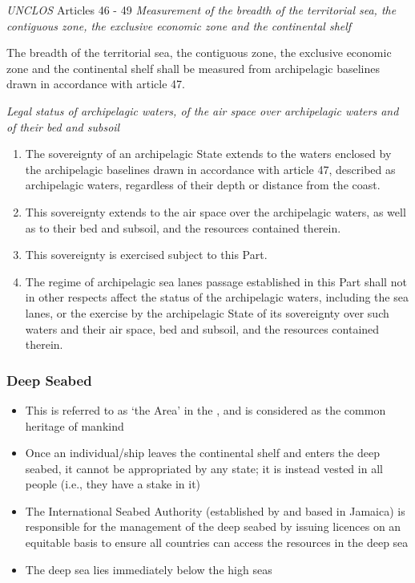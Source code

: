 \begin{conventiondetails}{\textit{UNCLOS} Articles 46 - 49}
    \textit{Measurement of the breadth of the territorial sea, the contiguous zone,
    the exclusive economic zone and the continental shelf}

    \vspace{\baselineskip}

    The breadth of the territorial sea, the contiguous zone, the exclusive economic zone and the continental shelf shall be measured from archipelagic baselines drawn in accordance with article 47.

    \textit{Legal status of archipelagic waters, of the air space over archipelagic waters and of their bed and subsoil}
    \begin{enumerate}
        \item The sovereignty of an archipelagic State extends to the waters enclosed by the archipelagic baselines drawn in accordance with article 47, described as archipelagic waters, regardless of their depth or distance from the coast.
        \item This sovereignty extends to the air space over the archipelagic waters, as well as to their bed and subsoil, and the resources contained therein.
        \item This sovereignty is exercised subject to this Part.
        \item The regime of archipelagic sea lanes passage established in this Part shall not in other respects affect the status of the archipelagic waters, including the sea lanes, or the exercise by the archipelagic State of its sovereignty over such waters and their air space, bed and subsoil, and the resources contained therein.
    \end{enumerate}

\end{conventiondetails}

\subsubsection{Deep Seabed}
\begin{itemize}
    \item This is referred to as `the Area' in the , and is considered as the common heritage of mankind
    \item Once an individual/ship leaves the continental shelf and enters the deep seabed, it cannot be appropriated by any state; it is instead vested in all people (i.e., they have a stake in it)
    \item The International Seabed Authority (established by  and based in Jamaica) is responsible for the management of the deep seabed by issuing licences on an equitable basis to ensure all countries can access the resources in the deep sea
    \item The deep sea lies immediately below the high seas
\end{itemize}

